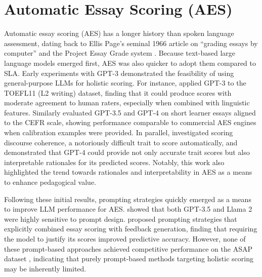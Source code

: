 \documentclass{report}
\begin{document}
\section{Automatic Essay Scoring (AES)}
\label{sec:automatic_essay_scoring}
Automatic essay scoring (AES) has a longer history than spoken language assessment, dating back to Ellis Page’s seminal 1966 article on “grading essays by computer” and the Project Essay Grade system \citep{page1966}. Because text-based large language models emerged first, AES was also quicker to adopt them compared to SLA. Early experiments with GPT-3 demonstrated the feasibility of using general-purpose LLMs for holistic scoring. For instance, \citet{aes_gpt3} applied GPT-3 \citep{gpt3} to the TOEFL11 (L2 writing) dataset, finding that it could produce scores with moderate agreement to human raters, especially when combined with linguistic features. Similarly \citet{yancey-etal-2023-rating} evaluated GPT-3.5 and GPT-4 \citep{openai2024gpt4technicalreport} on short learner essays aligned to the CEFR scale, showing performance comparable to commercial AES engines when calibration examples were provided. In parallel, \citet{naismith-etal-2023-automated} investigated scoring discourse coherence, a notoriously difficult trait to score automatically, and demonstrated that GPT-4 could provide not only accurate trait scores but also interpretable rationales for its predicted scores. Notably, this work also highlighted the trend towards rationales and interpretability in AES as a means to enhance pedagogical value.

Following these initial results, prompting strategies quickly emerged as a means to improve LLM performance for AES. \citet{mansour2024largelanguagemodelsautomatically} showed that both GPT-3.5 and Llama 2 \citep{touvron2023llama2openfoundation} were highly sensitive to prompt design. \citet{stahl2024exploringllmpromptingstrategies} proposed prompting strategies that explicitly combined essay scoring with feedback generation, finding that requiring the model to justify its scores improved predictive accuracy. However, none of these prompt-based approaches achieved competitive performance on the ASAP dataset  \citep{mathias-bhattacharyya-2018-asap}, indicating that purely prompt-based methods targeting holistic scoring may be inherently limited.
\end{document}
